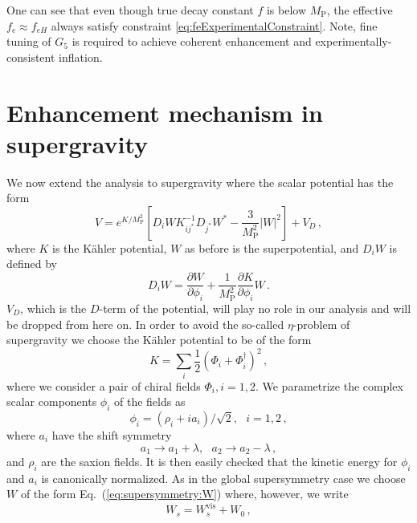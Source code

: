 \documentclass[12pt]{article}
\begin{document}
One can see that even though true decay constant $f$ is below $M_\text{P}$, the effective $f_e \approx f_{eH}$ always satisfy constraint \ref{eq:feExperimentalConstraint}.
Note, fine tuning of $G_5$ is required to achieve coherent enhancement and experimentally-consistent inflation.

\section{Enhancement mechanism in supergravity \label{sec:Supergravity}}
We now extend the analysis to supergravity where the scalar potential has the form~\cite{Chamseddine:1982jx, Cremmer:1982en}
\begin{equation} \label{eq:supergravity:potential}
  V = e^{K / M_\text{P}^2} \left[
    D_i W K^{-1}_{ij^*} D_{j^*} W^* - \frac{3}{M_\text{P}^2} \left|W\right|^2
  \right] + V_D\,,
\end{equation}
where $K$ is the K\"ahler potential, $W$ as before is the superpotential, and $D_i W$ is defined by
\begin{equation} \label{eq:supergravity:DW}
  D_i W = \frac{\partial W}{\partial \phi_i}
        + \frac{1}{M_\text{P}^2} \frac{\partial K}{\partial \phi_i} W\,.
\end{equation}
$V_D$, which is the $D$-term of the potential, will play no role in our analysis and will be dropped from here on.
In order to avoid the so-called $\eta$-problem of supergravity we choose the K\"ahler potential to be of the form
\begin{equation}
  K = \sum_i \frac{1}{2} \left(\Phi_i + \Phi_i^\dagger\right)^2\,,
\end{equation}
where we consider a pair of chiral fields $\Phi_i, i = 1, 2$.
We parametrize the complex scalar components $\phi_i$ of the fields as
\begin{equation}
  \phi_i = \left(\rho_i + i a_i\right) / \sqrt 2,
  ~~~ i = 1, 2\,,
\end{equation}
where $a_i$ have the shift symmetry
\begin{equation}
  a_1 \to a_1 + \lambda,
  ~~~ a_2 \to a_2 - \lambda\,,
\end{equation}
and $\rho_i$ are the saxion fields.
It is then easily checked that the kinetic energy for $\phi_i$ and $a_i$ is canonically normalized.
As in the global supersymmetry case we choose $W$ of the form Eq.~(\ref{eq:supersymmetry:W}) where, however, we write
\begin{equation}
  W_s = W_s^\text{vis} + W_0\,,
\end{equation}
\end{document}
